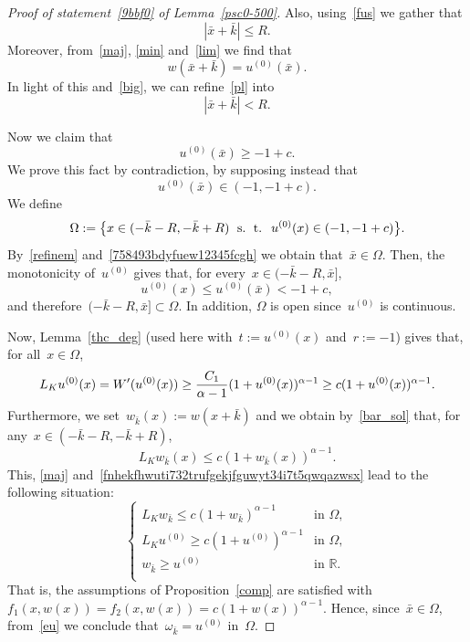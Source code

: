 \documentclass[10pt,a4paper]{amsart}
\numberwithin{equation}{section}
\newcommand{\R}{\mathbb{R}}
\begin{document}
\begin{proof}[Proof of statement~\eqref{9bbf0} of Lemma~\eqref{psc0-500}]
Also, using~\eqref{fus} we gather that
\begin{equation}\label{pl}
|\bar{x}+\bar{k}| \leq R.
\end{equation}
Moreover, from~\eqref{maj}, \eqref{min} and~\eqref{lim} we find that
\begin{equation}\label{eu}
w(\bar{x}+\bar{k})= u^{(0)}(\bar{x}).
\end{equation}
In light of this and~\eqref{big}, we can refine~\eqref{pl} into
\begin{equation}\label{refinem}
|\bar{x}+\bar{k}| < R.
\end{equation}

Now we claim that
\begin{equation}\label{claim_maj}
u^{(0)}(\bar{x}) \geq-1+c.
\end{equation}
We prove this fact by contradiction, by supposing instead that
\begin{equation}\label{758493bdyfuew12345fcgh}
u^{(0)}(\bar{x}) \in (-1, -1+c).\end{equation}
We define
\[ \Omega:= \big\{ x \in (-\bar{k}-R, -\bar{k}+R)\;{\mbox{ s. ~\!t. }}\; u^{(0)}(x)\in(-1,-1+c )\big\}.\]
By~\eqref{refinem} and~\eqref{758493bdyfuew12345fcgh} we obtain that~$\bar{x} \in \Omega$. Then, the monotonicity of~$u^{(0)}$ gives that, for every~$x\in(-\bar{k}-R, \bar{x}]$,
$$ u^{(0)}(x)\le u^{(0)}(\bar{x})<-1+c,
$$
and therefore~$(-\bar{k}-R, \bar{x}] \subset \Omega$.
In addition, $\Omega$ is open since~$u^{(0)}$ is continuous. 

Now, Lemma~\ref{thc_deg}
(used here with~$t:=u^{(0)}(x)$ and~$r:=-1$) gives that, for all~$x\in\Omega$,
\begin{equation}\label{fnhekfhwuti732trufgekjfguwyt34i7t5qwqazwsx}
L_K u^{(0)}(x)=W\rq{}(u^{(0)}(x))\ge \frac{C_1}{\alpha-1} (1+ u^{(0)}(x))^{\alpha-1}\ge c(1+ u^{(0)}(x))^{\alpha-1}. 
\end{equation}
Furthermore, we set~$w_{\bar{k}}(x):= w(x +\bar{k})$ and we obtain by~\eqref{bar_sol} that, for any~$x \in (-\bar k-R, -\bar k+R)$,
\begin{equation*}
{L}_K w_{\bar{k}}(x) \leq c (1+ w_{\bar{k}}(x))^{\alpha-1}.
\end{equation*}
This, \eqref{maj} and~\eqref{fnhekfhwuti732trufgekjfguwyt34i7t5qwqazwsx}
lead to the following situation:
\begin{equation*}
\begin{cases}
{L}_K w_{\bar{k}}\leq c (1+ w_{\bar{k}})^{\alpha-1} &\mbox{in } \Omega, \\
{L}_K u^{(0)} \geq c (1+ u^{(0)})^{\alpha-1} &\mbox{in } \Omega, \\
w_{\bar{k}} \geq u^{(0)} &\mbox{in } \R. \\
\end{cases}
\end{equation*}
That is, the assumptions of Proposition~\ref{comp} are satisfied
with~$f_1(x,w(x))=f_2(x,w(x))=c (1+ w(x))^{\alpha-1}$.
Hence, since~$\bar x\in\Omega$, from~\eqref{eu}
we conclude that~$\omega_{\bar{k}}= u^{(0)}$ in~$\Omega$.


\end{proof}
\end{document}
